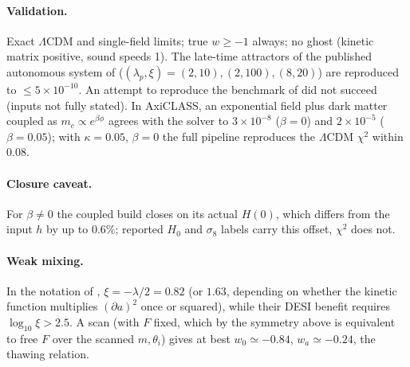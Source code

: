 \documentclass[11pt]{article}
\begin{document}
\paragraph{Validation.} Exact $\Lambda$CDM and single-field limits; true $w\ge-1$ always; no ghost (kinetic matrix
positive, sound speeds 1). The late-time attractors of the published autonomous system of \cite{ramos2026}
($(\lambda_p,\xi)=(2,10),(2,100),(8,20)$) are reproduced to $\le5\times10^{-10}$. An attempt to reproduce the
benchmark of \cite{toomey2025} did not succeed (inputs not fully stated). In AxiCLASS, an exponential field plus dark
matter coupled as $m_c\propto e^{\beta\phi}$ agrees with the solver to $3\times10^{-8}$ ($\beta=0$) and $2\times10^{-5}$
($\beta=0.05$); with $\kappa=0.05$, $\beta=0$ the full pipeline reproduces the $\Lambda$CDM $\chi^2$ within 0.08.
\paragraph{Closure caveat.} For $\beta\ne0$ the coupled build closes on its actual $H(0)$, which differs from the input
$h$ by up to $0.6\%$; reported $H_0$ and $\sigma_8$ labels carry this offset, $\chi^2$ does not.
\paragraph{Weak mixing.} In the notation of \cite{ramos2026,ramos2026b}, $\xi=-\lambda/2=0.82$ (or $1.63$, depending
on whether the kinetic function multiplies $(\partial a)^2$ once or squared), while their DESI benefit requires
$\log_{10}\xi>2.5$. A scan (with $F$ fixed, which by the symmetry above is equivalent to free $F$ over the scanned $m,\theta_i$) gives at best $w_0\simeq-0.84$, $w_a\simeq-0.24$, the thawing relation.
\end{document}
